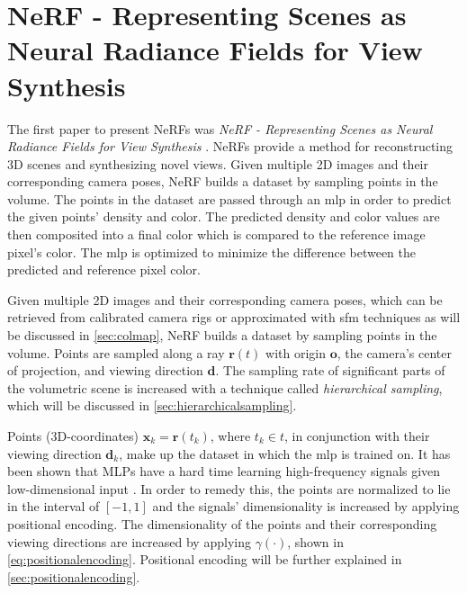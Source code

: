 \section[NeRF]{NeRF - Representing Scenes as Neural Radiance Fields for View Synthesis} \label{sec:nerf}
The first paper to present NeRFs was \textit{NeRF - Representing Scenes as Neural Radiance Fields for View Synthesis} \cite{mildenhall_nerf_2020}. NeRFs provide a method for reconstructing 3D scenes and synthesizing novel views. Given multiple 2D images and their corresponding camera poses, NeRF builds a dataset by sampling points in the volume. The points in the dataset are passed through an \acrshort{mlp} in order to predict the given points' density and color. The predicted density and color values are then composited into a final color which is compared to the reference image pixel's color. The \acrshort{mlp} is optimized to minimize the difference between the predicted and reference pixel color.


Given multiple 2D images and their corresponding camera poses, which can be retrieved from calibrated camera rigs or approximated with \acrfull{sfm} techniques as will be discussed in \autoref{sec:colmap}, NeRF builds a dataset by sampling points in the volume. Points are sampled along a ray $\pmb{r}(t)$ with origin $\textbf{o}$, the camera's center of projection, and viewing direction $\textbf{d}$. The sampling rate of significant parts of the volumetric scene is increased with a technique called \textit{hierarchical sampling}, which will be discussed in \autoref{sec:hierarchicalsampling}.




Points (3D-coordinates) $\pmb{x}_k = \pmb{r}(t_k)$, where $t_k \in t$, in conjunction with their viewing direction $\pmb{d}_k$, make up the dataset in which the \acrshort{mlp} is trained on. It has been shown that MLPs have a hard time learning high-frequency signals given low-dimensional input \cite{tancik_fourier_2020}. In order to remedy this, the points are normalized to lie in the interval of $[-1, 1]$ and the signals' dimensionality is increased by applying positional encoding. The dimensionality of the points and their corresponding viewing directions are increased by applying $\gamma(\cdot)$, shown in \autoref{eq:positionalencoding}. Positional encoding will be further explained in \autoref{sec:positionalencoding}.

